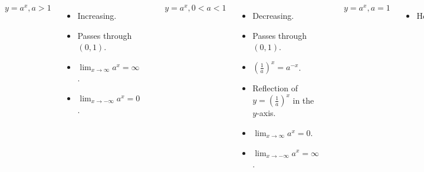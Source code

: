 \begin{frame}
\begin{columns}[t]
\includegraphics[height=3cm]{exponential-functions/exponential-function-properties/pictures/07-02-exptypesa.pdf}%

$y = a^x, a > 1$
\begin{itemize}
\item<2->  Increasing.
\item<3->  Passes through $(0,1)$.
\item<4->  $\lim_{x \rightarrow \infty} a^x = \infty$.
\item<5->  $\lim_{x \rightarrow -\infty} a^x = 0$.
\end{itemize}
\includegraphics[height=3cm]{exponential-functions/exponential-function-properties/pictures/07-02-exptypesb.pdf}%

$y = a^x, 0 < a < 1$
\begin{itemize}
\item<6->  Decreasing.
\item<7->  Passes through $(0,1)$.
\item<8->  $\left(\frac{1}{a}\right)^x = a^{-x}$.
\item<9->  Reflection of $y = \left(\frac{1}{a}\right)^x$ in the $y$-axis.
\item<10->  $\lim_{x \rightarrow \infty} a^x = 0$.
\item<11->  $\lim_{x \rightarrow -\infty} a^x = \infty$.
\end{itemize}
\includegraphics[height=3cm]{exponential-functions/exponential-function-properties/pictures/07-02-exptypesc.pdf}%

$y = a^x, a = 1$
\begin{itemize}
\item<12->  Horizontal.
\end{itemize}
\end{columns}
\end{frame}


